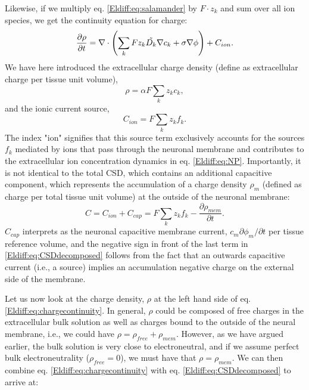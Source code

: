 Likewise, if we multiply eq. \ref{Eldiff:eq:salamander} by $F\cdot z_k$ and sum over all ion species, we get the continuity equation for charge: 
\begin{equation}
\frac{\partial \rho}{\partial t} =  \nabla \cdot \left (\sum_k{F z_k \tilde{D_k}{\bf \nabla} c_{k}} + \sigma\nabla\phi  \right)  + C_{ion}.
\label{Eldiff:eq:chargecontinuity}
\end{equation}
We have here introduced the extracellular charge density (define as extracellular charge per tissue unit volume), 
\begin{equation}
\rho = \alpha F \sum_k z_k c_k,  
\label{Eldiff:eq:roen}
\end{equation}
and the ionic current source, 
\begin{equation}
C_{ion} = F \sum_k z_k f_k. 
\label{Eldiff:eq:csden}
\end{equation}
The index "ion" signifies that this source term exclusively accounts for the sources $f_k$ mediated by ions that pass through the neuronal membrane and contributes to the extracellular ion concentration dynamics in eq. \ref{Eldiff:eq:NP}. Importantly, it is not identical to the total CSD, which contains an additional capacitive component, which represents the accumulation of a charge density $\rho_m$ (defined as charge per total tissue unit volume) at the outside of the neuronal membrane:
\begin{equation}
C = C_{ion} + C_{cap} = F \sum_k z_k f_k - \frac{\partial \rho_{mem}}{\partial t}.
\label{Eldiff:eq:CSDdecomposed}
\end{equation}
$C_{cap}$ interprets as the neuronal capacitive membrane current, $c_m \partial \phi_m/\partial t$ per tissue reference volume, and the negative sign in front of the last term in \ref{Eldiff:eq:CSDdecomposed} follows from the fact that an outwards capacitive current (i.e., a source) implies an accumulation negative charge on the external side of the membrane. 

Let us now look at the charge density, $\rho$ at the left hand side of eq. \ref{Eldiff:eq:chargecontinuity}. In general, $\rho$ could be composed of free charges in the extracellular bulk solution as well as charges bound to the outside of the neural membrane, i.e., we could have $\rho = \rho_{free} + \rho_{mem}$. However, as we have argued earlier, the bulk solution is very close to electroneutral, and if we assume perfect bulk electroneutrality ($\rho_{free} = 0$), we must have that $\rho=\rho_{mem}$. We can then combine eq. \ref{Eldiff:eq:chargecontinuity}  with eq. \ref{Eldiff:eq:CSDdecomposed} to arrive at:

